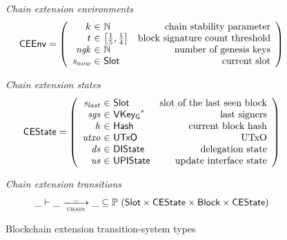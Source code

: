 \documentclass[11pt,a4paper]{article}
\newcommand{\powerset}[1]{\mathbb{P}~#1}
\newcommand{\var}[1]{\mathit{#1}}
\newcommand{\type}[1]{\mathsf{#1}}
\newcommand{\trans}[2]{\xlongrightarrow[\textsc{#1}]{#2}}
\newcommand{\seqof}[1]{#1^{*}}
\newcommand{\Hash}{\type{Hash}}  %
\newcommand{\Slot}{\type{Slot}}
\newcommand{\Block}{\type{Block}}
\newcommand{\VKeyGen}{\type{VKey_G}}
\begin{document}
\begin{figure}[ht]
  \emph{Chain extension environments}
  \begin{equation*}
    \CEEnv
    = \left(
      \begin{array}{r@{~\in~}lr}
        k & \mathbb{N} & \text{chain stability parameter}\\
        t & \left[\frac{1}{5}, \frac{1}{4}\right] & \text{block signature count threshold}\\
        \var{ngk} & \mathbb{N} & \text{number of genesis keys}\\
        \var{s_{now}} & \Slot & \text{current slot}
      \end{array}\right)
  \end{equation*}


  \emph{Chain extension states}
  \begin{equation*}
    \CEState =
    \left(
      \begin{array}{r@{~\in~}lr}
        \var{s_{last}} & \Slot & \text{slot of the last seen block} \\
        \var{sgs} & \seqof{\VKeyGen} & \text{last signers}\\
        \var{h} & \Hash & \text{current block hash} \\
        \var{utxo} & \UTxO & \text{UTxO} \\
        \var{ds} & \DIState & \text{delegation state}\\
        \var{us} & \UPIState & \text{update interface state} \\
      \end{array}
    \right)
  \end{equation*}

  \emph{Chain extension transitions}
  \begin{equation*}
    \_ \vdash \var{\_} \trans{chain}{\_} \var{\_} \subseteq
    \powerset (\Slot \times \CEState \times \Block \times \CEState)
  \end{equation*}

  \caption{Blockchain extension transition-system types}
  \label{fig:ts-types:chain-extension}
\end{figure}
\end{document}
